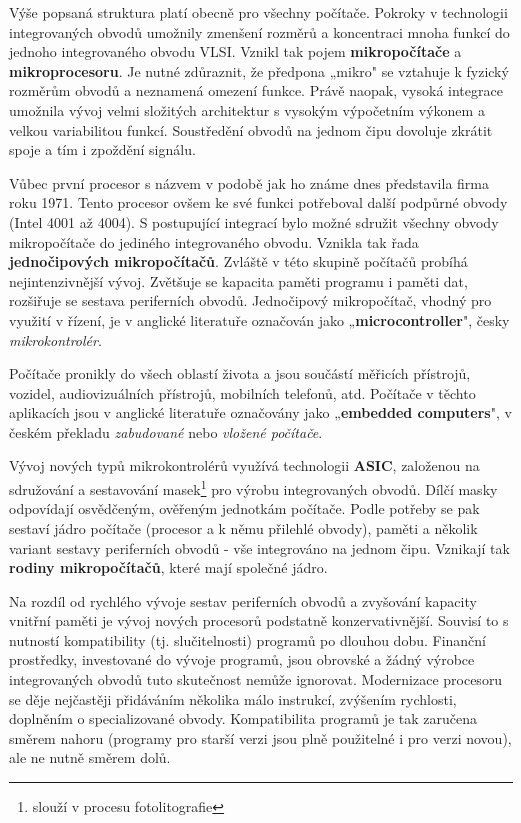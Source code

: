     Výše popsaná struktura platí obecně pro všechny počítače. Pokroky v technologii integrovaných 
    obvodů umožnily zmenšení rozměrů a koncentraci mnoha funkcí do jednoho integrovaného obvodu 
    VLSI. Vznikl tak pojem \textbf{mikropočítače} a \textbf{mikroprocesoru}. Je nutné zdůraznit, že 
    předpona „mikro" se vztahuje k fyzický rozměrům obvodů a neznamená omezení funkce. Právě 
    naopak, vysoká integrace umožnila vývoj velmi složitých architektur s vysokým výpočetním 
    výkonem a velkou variabilitou funkcí. Soustředění obvodů na jednom čipu dovoluje zkrátit spoje 
    a tím i zpoždění signálu.   
       
    Vůbec první procesor s názvem \wikiIntelfirst v podobě jak ho známe dnes představila firma 
    \wikiIntelCompany roku 1971. Tento procesor ovšem ke své funkci potřeboval další podpůrné 
    obvody (Intel 4001 až 4004). S postupující integrací bylo možné sdružit všechny obvody 
    mikropočítače do jediného integrovaného obvodu. Vznikla tak řada \textbf{jednočipových 
    mikropočítačů}. Zvláště v této skupině počítačů probíhá nejintenzivnější vývoj. Zvětšuje se 
    kapacita paměti programu i paměti dat, rozšiřuje se sestava periferních obvodů. Jednočipový 
    mikropočítač, vhodný pro využití v řízení, je v anglické literatuře označován jako 
    „\textbf{mi\-cro\-con\-tro\-ller}", česky \emph{mikrokontrolér}.
    
    Počítače pronikly do všech oblastí života a jsou součástí měřicích přístrojů, vozidel, 
    audiovizuálních přístrojů, mobilních telefonů, atd. Počítače v těchto aplikacích jsou v 
    anglické literatuře označovány jako „\textbf{embedded computers}", v českém překladu 
    \emph{zabudované} nebo \emph{vložené počítače}.
    
    Vývoj nových typů mikrokontrolérů využívá technologii \textbf{ASIC}, založenou na sdružování a 
    sestavování masek\footnote{slouží v procesu fotolitografie} pro výrobu integrovaných obvodů. 
    Dílčí masky odpovídají osvědčeným, ověřeným jednotkám počítače. Podle potřeby se pak sestaví 
    jádro počítače (procesor a k němu přilehlé obvody), paměti a několik variant sestavy 
    periferních obvodů - vše integrováno na jednom čipu. Vznikají tak \textbf{rodiny 
    mikropočítačů}, které mají společné jádro.
    
    Na rozdíl od rychlého vývoje sestav periferních obvodů a zvyšování kapacity vnitřní paměti je 
    vývoj nových procesorů podstatně konzervativnější. Souvisí to s nutností kompatibility (tj. 
    slučitelnosti) programů po dlouhou dobu. Finanční prostředky, investované do vývoje programů, 
    jsou obrovské a žádný výrobce integrovaných obvodů tuto skutečnost nemůže ignorovat. 
    Modernizace procesoru se děje nejčastěji přidáváním několika málo instrukcí, zvýšením 
    rychlosti, doplněním o specializované obvody. Kompatibilita programů je tak zaručena směrem 
    nahoru (programy pro starší verzi jsou plně použitelné i pro verzi 
    novou), ale ne nutně směrem dolů.
    
